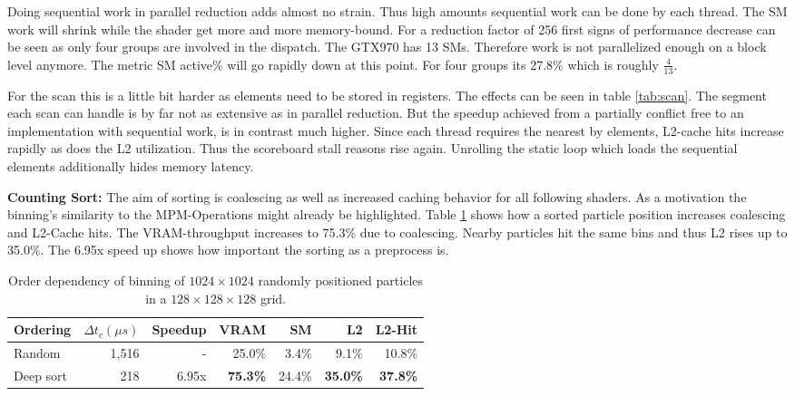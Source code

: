 \documentclass[m,times]{cgMA}
\begin{document}
Doing sequential work in parallel reduction adds almost no strain. Thus high amounts sequential work can be done by each thread. The SM work will shrink while the shader get more and more memory-bound. For a reduction factor of 256 first signs of performance decrease can be seen as only four groups are involved in the dispatch. The GTX970 has 13 SMs. Therefore work is not parallelized enough on a block level anymore. The metric SM active\% will go rapidly down at this point. For four groups its 27.8\% which is roughly $\frac{4}{13}$.

For the scan this is a little bit harder as elements need to be stored in registers. The effects can be seen in table \ref{tab:scan}. The segment each scan can handle is by far not as extensive as in parallel reduction. But the speedup achieved from a partially conflict free to an implementation with sequential work, is in contrast much higher. Since each thread requires the nearest by elements, L2-cache hits increase rapidly as does the L2 utilization. Thus the scoreboard stall reasons rise again. Unrolling the static loop which loads the sequential elements additionally hides memory latency.

\textbf{Counting Sort:} The aim of sorting is coalescing as well as increased caching behavior for all following shaders. As a motivation the binning's similarity to the MPM-Operations might already be highlighted. Table \ref{table:bin} shows how a sorted particle position increases coalescing and L2-Cache hits. The VRAM-throughput increases to 75.3\% due to coalescing. Nearby particles hit the same bins and thus L2 rises up to 35.0\%. The 6.95x speed up shows how important the sorting as a preprocess is.
\begin{table}[htbp]
  \begin{tabular}{ | l | r | r | r | r | r | r |}    \hline
    Ordering            &  $\Delta t_c (\mu s)$ & Speedup &VRAM              & SM      & L2     & L2-Hit \\\hline
    Random              &  1,516                & -       &25.0\%            & 3.4\%   & 9.1\%  & 10.8\% \\\hline
    Deep sort           &    218                & 6.95x   &\textbf{75.3\%}   & 24.4\%  & \textbf{35.0\%} & \textbf{37.8\%} \\
    \hline
 \end{tabular}
\caption{Order dependency of binning of $1024\times1024$ randomly positioned particles in a $128\times128\times128$ grid.}\label{table:bin}
\end{table}
\end{document}
